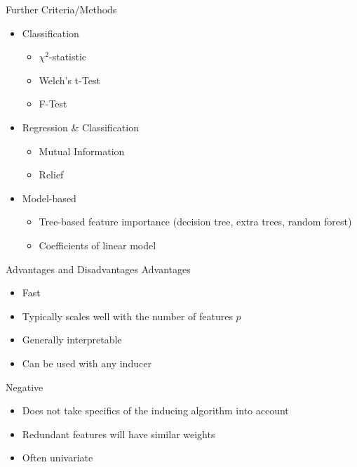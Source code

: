\documentclass[11pt,compress,t,notes=noshow, aspectratio=169, xcolor=table]{beamer}
\begin{document}
\begin{frame}{}
 
\end{frame}

\begin{frame}{Further Criteria/Methods}
    \begin{itemize}
        \item Classification
        \begin{itemize}
            \item $\chi^2$-statistic
            \item Welch's t-Test
            \item F-Test
            
        \end{itemize}
        \item Regression \& Classification
        \begin{itemize}
            \item Mutual Information
            \item Relief
        \end{itemize}
        \item Model-based
        \begin{itemize}
            \item Tree-based feature importance (decision tree, extra trees, random forest)
            \item Coefficients of linear model
        \end{itemize}
    \end{itemize}
\end{frame}

\begin{frame}{}
 
\end{frame}

\begin{frame}{Advantages and Disadvantages}
    Advantages
    \begin{itemize}
        \item Fast
        \item Typically scales well with the number of features $p$
        \item Generally interpretable
        \item Can be used with any inducer
    \end{itemize}
    Negative
    \begin{itemize}
        \item Does not take specifics of the inducing algorithm into account
        \item Redundant features will have similar weights
        \item Often univariate
    \end{itemize}
\end{frame}
\end{document}
